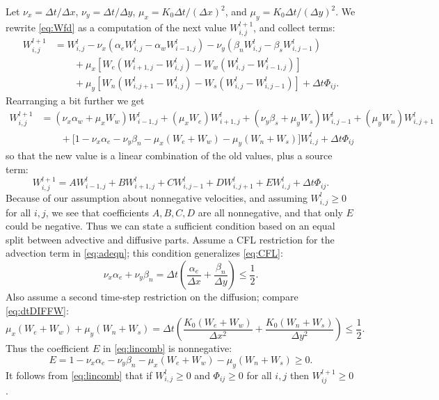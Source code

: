 \documentclass[11pt,final]{amsart}%
\newcommand{\Wlij}{W^l_{i,j}}
\begin{document}
Let $\nu_x = \Delta t/\Delta x$, $\nu_y = \Delta t/\Delta y$, $\mu_x = K_0 \Delta t / (\Delta x)^2$, and $\mu_y = K_0 \Delta t / (\Delta y)^2$.  We rewrite \eqref{eq:Wfd} as a computation of the next value $W_{i,j}^{l+1}$, and collect terms:
\begin{align*}
 W_{i,j}^{l+1} &= \Wlij - \nu_x \left(\alpha_e \Wlij - \alpha_w W_{i-1,j}^l\right) - \nu_y \left(\beta_n \Wlij - \beta_s W_{i,j-1}^l\right)  \\
      &\qquad + \mu_x \left[W_e \left(W_{i+1,j}^l - \Wlij\right) - W_w \left(\Wlij - W_{i-1,j}^l\right)\right]  \\
      &\qquad + \mu_y \left[W_n \left(W_{i,j+1}^l - \Wlij\right) - W_s \left(\Wlij - W_{i,j-1}^l\right)\right] + \Delta t \Phi_{ij}.
\end{align*}
Rearranging a bit further we get
\begin{align*}
 W_{i,j}^{l+1} &= (\nu_x \alpha_w + \mu_x W_w) W_{i-1,j}^l + (\mu_x W_e) W_{i+1,j}^l + (\nu_y \beta_s + \mu_y W_s) W_{i,j-1}^l + (\mu_y W_n) W_{i,j+1}^l \\
      &\qquad + \Big[1 - \nu_x \alpha_e - \nu_y \beta_n - \mu_x (W_e + W_w) - \mu_y (W_n + W_s)\Big] \Wlij + \Delta t \Phi_{ij}
\end{align*}
so that the new value is a linear combination of the old values, plus a source term:
\begin{equation}
W_{i,j}^{l+1} = A W_{i-1,j}^l + B W_{i+1,j}^l + C W_{i,j-1}^l + D W_{i,j+1}^l + E \Wlij + \Delta t \Phi_{ij}. \label{eq:lincomb}
\end{equation}
Because of our assumption about nonnegative velocities, and assuming $\Wlij \ge 0$ for all $i,j$, we see that coefficients $A,B,C,D$ are all nonnegative, and that only $E$ could be negative.  Thus we can state a sufficient condition based on an equal split between advective and diffusive parts.  Assume a CFL restriction for the advection term in \eqref{eq:adeqn}; this condition generalizes \eqref{eq:CFL}:
\begin{equation}
\nu_x \alpha_e + \nu_y \beta_n = \Delta t \left(\frac{\alpha_e}{\Delta x} + \frac{\beta_n}{\Delta y}\right) \le \frac{1}{2}. \label{eq:adstabcond}
\end{equation}
Also assume a second time-step restriction on the diffusion; compare \eqref{eq:dtDIFFW}:
\begin{equation}
\mu_x (W_e + W_w) + \mu_y (W_n + W_s) = \Delta t \left(\frac{K_0(W_e + W_w)}{\Delta x^2} + \frac{K_0(W_n + W_s)}{\Delta y^2}\right) \le \frac{1}{2}. \label{eq:diffstabcond}
\end{equation}
Thus the coefficient $E$ in \eqref{eq:lincomb} is nonnegative:
	$$E = 1 - \nu_x \alpha_e - \nu_y \beta_n - \mu_x (W_e + W_w) - \mu_y (W_n + W_s) \ge 0.$$
It follows from \eqref{eq:lincomb} that if $\Wlij\ge 0$ and $\Phi_{ij}\ge 0$ for all $i,j$ then $W_{ij}^{l+1}\ge 0$.
\end{document}

